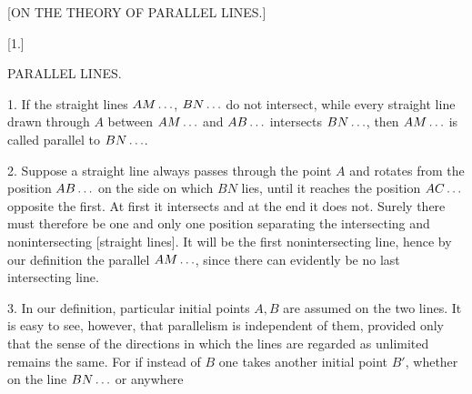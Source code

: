 \clearpage{}
\begin{center}
[ON THE THEORY OF PARALLEL LINES.]
\end{center}

\begin{center}
[1.]

PARALLEL LINES.
\end{center}

1. If the straight lines $AM\mathinner{.\,.\,.}$, $BN\mathinner{.\,.\,.}$ do not intersect, while every straight line drawn through $A$ between $AM\mathinner{.\,.\,.}$ and $AB\mathinner{.\,.\,.}$ intersects $BN\mathinner{.\,.\,.}$, then $AM\mathinner{.\,.\,.}$ is called parallel to $BN\mathinner{.\,.\,.}$.

2. Suppose a straight line always passes through the point $A$ and rotates from the position $AB\mathinner{.\,.\,.}$ on the side on which $BN$ lies, until it reaches the position $AC\mathinner{.\,.\,.}$ opposite the first. At first it intersects and at the end it does not. Surely there must therefore be one and only one position separating the intersecting and nonintersecting [straight lines]. It will be the first nonintersecting line, hence by our definition the parallel $AM\mathinner{.\,.\,.}$, since there can evidently be no last intersecting line.

\begin{center}

\end{center}

3. In our definition, particular initial points $A, B$ are assumed on the two lines. It is easy to see, however, that parallelism is independent of them, provided only that the sense of the directions in which the lines are regarded as unlimited remains the same. For if instead of $B$ one takes another initial point $B'$, whether on the line $BN\mathinner{.\,.\,.}$ or anywhere
